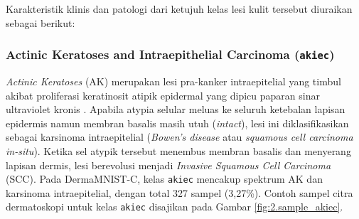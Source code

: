 \begin{table}[H]
	\centering
	\caption{Distribusi Sampel per Kelas pada Partisi Baku DermaMNIST-C}
	\label{table:2.dermamnist_c}
\end{table}

Karakteristik klinis dan patologi dari ketujuh kelas lesi kulit tersebut diuraikan sebagai berikut:

\subsubsection{Actinic Keratoses and Intraepithelial Carcinoma (\texttt{akiec})}
\textit{Actinic Keratoses} (AK) merupakan lesi pra-kanker intraepitelial yang timbul akibat proliferasi keratinosit atipik epidermal yang dipicu paparan sinar ultraviolet kronis \cite{cockerell2000histopathology}. Apabila atypia selular meluas ke seluruh ketebalan lapisan epidermis namun membran basalis masih utuh (\textit{intact}), lesi ini diklasifikasikan sebagai karsinoma intraepitelial (\textit{Bowen's disease} atau \textit{squamous cell carcinoma in-situ}). Ketika sel atypik tersebut menembus membran basalis dan menyerang lapisan dermis, lesi berevolusi menjadi \textit{Invasive Squamous Cell Carcinoma} (SCC). Pada DermaMNIST-C, kelas \texttt{akiec} mencakup spektrum AK dan karsinoma intraepitelial, dengan total 327 sampel (3,27\%). Contoh sampel citra dermatoskopi untuk kelas \texttt{akiec} disajikan pada Gambar \ref{fig:2.sample_akiec}. \par

